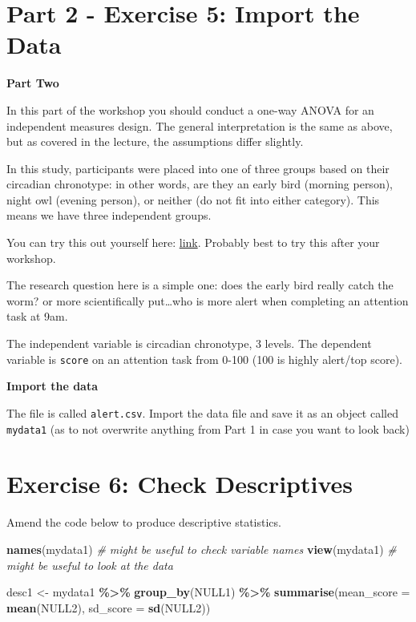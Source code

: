 \documentclass[
]{book}
\newenvironment{Shaded}{\begin{snugshade}}{\end{snugshade}}
\newcommand{\AttributeTok}[1]{\textcolor[rgb]{0.13,0.29,0.53}{#1}}
\newcommand{\CommentTok}[1]{\textcolor[rgb]{0.56,0.35,0.01}{\textit{#1}}}
\newcommand{\FunctionTok}[1]{\textcolor[rgb]{0.13,0.29,0.53}{\textbf{#1}}}
\newcommand{\NormalTok}[1]{#1}
\newcommand{\OtherTok}[1]{\textcolor[rgb]{0.56,0.35,0.01}{#1}}
\newcommand{\SpecialCharTok}[1]{\textcolor[rgb]{0.81,0.36,0.00}{\textbf{#1}}}
\let\oldsection\section
\renewcommand{\section}{\needspace{5\baselineskip}\oldsection}
\begin{document}
\section{Part 2 - Exercise 5: Import the Data}\label{part-2---exercise-5-import-the-data-1}

\textbf{Part Two}

In this part of the workshop you should conduct a one-way ANOVA for an independent measures design. The general interpretation is the same as above, but as covered in the lecture, the assumptions differ slightly.

In this study, participants were placed into one of three groups based on their circadian chronotype: in other words, are they an early bird (morning person), night owl (evening person), or neither (do not fit into either category). This means we have three independent groups.

You can try this out yourself here: \href{https://qxmd.com/calculate/calculator_829/morningness-eveningness-questionnaire-meq\#}{link}. Probably best to try this after your workshop.

The research question here is a simple one: does the early bird really catch the worm? or more scientifically put\ldots who is more alert when completing an attention task at 9am.

The independent variable is circadian chronotype, 3 levels.
The dependent variable is \texttt{score} on an attention task from 0-100 (100 is highly alert/top score).

\textbf{Import the data}

The file is called \texttt{alert.csv}. Import the data file and save it as an object called \texttt{mydata1} (as to not overwrite anything from Part 1 in case you want to look back)

\section{Exercise 6: Check Descriptives}\label{exercise-6-check-descriptives}

Amend the code below to produce descriptive statistics.

\begin{Shaded}
\begin{Highlighting}[]
\FunctionTok{names}\NormalTok{(mydata1)  }\CommentTok{\# might be useful to check variable names}
\FunctionTok{view}\NormalTok{(mydata1)   }\CommentTok{\# might be useful to look at the data}

\NormalTok{desc1 }\OtherTok{\textless{}{-}}\NormalTok{ mydata1 }\SpecialCharTok{\%\textgreater{}\%}
  \FunctionTok{group\_by}\NormalTok{(NULL1) }\SpecialCharTok{\%\textgreater{}\%}
  \FunctionTok{summarise}\NormalTok{(}\AttributeTok{mean\_score =} \FunctionTok{mean}\NormalTok{(NULL2),}
            \AttributeTok{sd\_score =} \FunctionTok{sd}\NormalTok{(NULL2))}
\end{Highlighting}
\end{Shaded}
\end{document}
